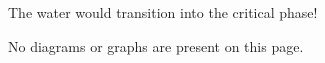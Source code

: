 The water would transition into the critical phase!  

No diagrams or graphs are present on this page.